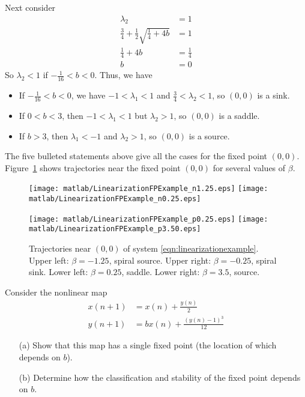 \begin{xexample}
Next consider
\begin{equation}
\begin{split}
   \lambda_2 & = 1 \\
   \frac{3}{4} + \frac{1}{2} \sqrt{\frac{1}{4}+4b} & = 1 \\
   \frac{1}{4}+4b & = \frac{1}{4} \\
   b & = 0
\end{split}
\end{equation}
So $\lambda_2 < 1$ if $-\frac{1}{16} < b < 0$.
Thus, we have
\begin{itemize}
\item
If $-\frac{1}{16} < b < 0$, we have $-1 < \lambda_1 < 1$ and $\frac{3}{4} < \lambda_2 < 1$, so
$(0,0)$ is a sink.
\item
If $0 < b < 3$, then $-1 < \lambda_1 < 1$ but $\lambda_2 > 1$, so 
$(0,0)$ is a saddle.
\item
If $b > 3$, then $\lambda_1 < -1$ and $\lambda_2 > 1$, so
$(0,0)$ is a source.
\end{itemize}
The five bulleted statements above give all the cases for the
fixed point $(0,0)$.
Figure~\ref{fig:LinearizationFPExamples} shows trajectories
near the fixed point $(0,0)$ for several values of $\beta$.
\begin{figure}
\centerline{%
\texttt{[image: matlab/LinearizationFPExample\_n1.25.eps]}
\texttt{[image: matlab/LinearizationFPExample\_n0.25.eps]}
}
\centerline{%
\texttt{[image: matlab/LinearizationFPExample\_p0.25.eps]}
\texttt{[image: matlab/LinearizationFPExample\_p3.50.eps]}
}
\caption{Trajectories near $(0,0)$ of system
\eqref{eqn:linearizationexample}. Upper left: $\beta=-1.25$, spiral source.
Upper right: $\beta=-0.25$, spiral sink.
Lower left: $\beta=0.25$, saddle.
Lower right: $\beta=3.5$, source.}
\label{fig:LinearizationFPExamples}
\end{figure}
\end{xexample}

\begin{exercises}
\begin{exercise}
Consider the nonlinear map
\begin{equation}
\begin{split}
  x(n+1) & = x(n) + \frac{y(n)}{2} \\
  y(n+1) & = bx(n) + \frac{(y(n)-1)^3}{12}
\end{split}
\end{equation}
\begin{enumerate}
\item[(a)]
Show that this map has a single fixed point
(the location of which depends on $b$).
\item[(b)]
Determine how the classification and stability
of the fixed point depends on $b$.
\end{enumerate}
\end{exercise}
\end{exercises}

